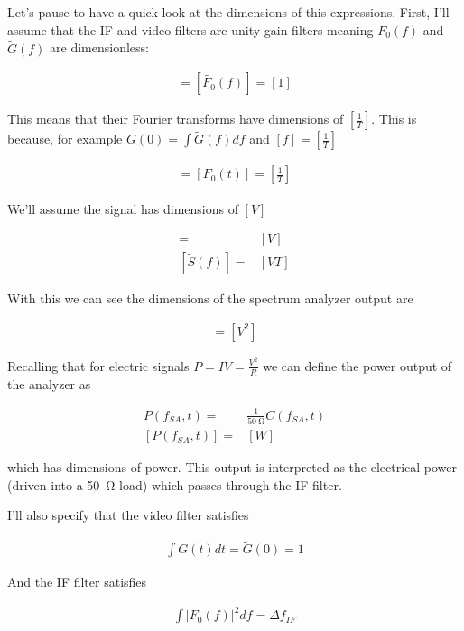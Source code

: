 \documentclass[12pt]{article}
\begin{document}
Let's pause to have a quick look at the dimensions of this expressions.
First, I'll assume that the IF and video filters are unity gain filters meaning $\tilde{F_0}(f)$ and $\tilde{G}(f)$ are dimensionless:

\begin{align}
[\tilde{G}(f)] = [\tilde{F_0}(f)] = [1]
\end{align}

This means that their Fourier transforms have dimensions of $\left[\frac{1}{T}\right]$.
This is because, for example $G(0) = \int \tilde{G}(f) df$ and $[f] = \left[\frac{1}{T}\right]$

\begin{align}
[G(t)] = [F_0(t)] = \left[\frac{1}{T}\right]
\end{align}

We'll assume the signal has dimensions of $[V]$

\begin{align}
[S(t)] =& [V]\\
[\tilde{S}(f)] =& [VT]
\end{align}


With this we can see the dimensions of the spectrum analyzer output are

\begin{align}
[C(f_{SA}, t)] = [V^2]
\end{align}

Recalling that for electric signals $P = IV = \frac{V^2}{R}$ we can define the power output of the analyzer as

\begin{align}
P(f_{SA}, t) =& \frac{1}{\SI{50}{\ohm}} C(f_{SA}, t)\\
\left[P(f_{SA}, t)\right] =& \left[W\right]
\end{align}

which has dimensions of power.
This output is interpreted as the electrical power (driven into a \SI{50}{\ohm} load) which passes through the IF filter.

I'll also specify that the video filter satisfies

\begin{align}
\int G(t) dt = \tilde{G}(0) = 1
\end{align}

And the IF filter satisfies

\begin{align}
\int |F_0(f)|^2 df = \Delta f_{IF}
\end{align}
\end{document}
